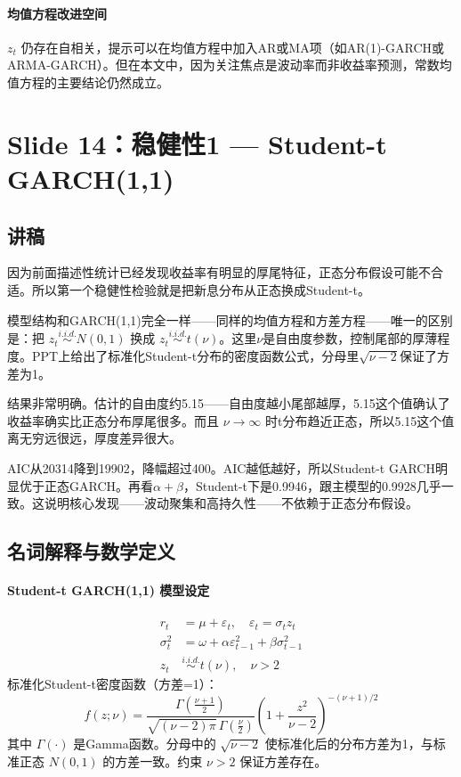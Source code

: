 \documentclass[11pt,a4paper]{article}
\begin{document}
\paragraph{均值方程改进空间} \(z_t\) 仍存在自相关，提示可以在均值方程中加入AR或MA项（如AR(1)-GARCH或ARMA-GARCH）。但在本文中，因为关注焦点是波动率而非收益率预测，常数均值方程的主要结论仍然成立。

\newpage
\section*{Slide 14：稳健性1 — Student-t GARCH(1,1)}

\subsection*{讲稿}
因为前面描述性统计已经发现收益率有明显的厚尾特征，正态分布假设可能不合适。所以第一个稳健性检验就是把新息分布从正态换成Student-t。

模型结构和GARCH(1,1)完全一样——同样的均值方程和方差方程——唯一的区别是：把 \(z_t \stackrel{i.i.d.}{\sim} N(0,1)\) 换成 \(z_t \stackrel{i.i.d.}{\sim} t(\nu)\)。这里\(\nu\)是自由度参数，控制尾部的厚薄程度。PPT上给出了标准化Student-t分布的密度函数公式，分母里\(\sqrt{\nu-2}\)保证了方差为1。

结果非常明确。估计的自由度约5.15——自由度越小尾部越厚，5.15这个值确认了收益率确实比正态分布厚尾很多。而且 \(\nu \to \infty\) 时t分布趋近正态，所以5.15这个值离无穷远很远，厚度差异很大。

AIC从20314降到19902，降幅超过400。AIC越低越好，所以Student-t GARCH明显优于正态GARCH。再看\(\alpha + \beta\)，Student-t下是0.9946，跟主模型的0.9928几乎一致。这说明核心发现——波动聚集和高持久性——不依赖于正态分布假设。

\subsection*{名词解释与数学定义}

\paragraph{Student-t GARCH(1,1) 模型设定}
\begin{align*}
r_t &= \mu + \varepsilon_t, \quad \varepsilon_t = \sigma_t z_t\\
\sigma_t^2 &= \omega + \alpha \varepsilon_{t-1}^2 + \beta \sigma_{t-1}^2\\
z_t &\stackrel{i.i.d.}{\sim} t(\nu), \quad \nu > 2
\end{align*}
标准化Student-t密度函数（方差=1）：
\[
f(z;\nu) = \frac{\Gamma(\frac{\nu+1}{2})}{\sqrt{(\nu-2)\pi}\,\Gamma(\frac{\nu}{2})}
\left(1 + \frac{z^2}{\nu-2}\right)^{-(\nu+1)/2}
\]
其中 \(\Gamma(\cdot)\) 是Gamma函数。分母中的 \(\sqrt{\nu-2}\) 使标准化后的分布方差为1，与标准正态 \(N(0,1)\) 的方差一致。约束 \(\nu > 2\) 保证方差存在。
\end{document}
